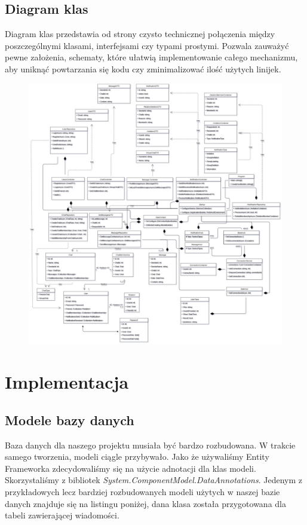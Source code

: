 \documentclass[12pt,a4paper]{article}
\begin{document}
\subsection{Diagram klas}
\hspace*{0.7cm} Diagram klas przedstawia od strony czysto technicznej połączenia między poszczególnymi klasami, interfejsami czy typami prostymi. Pozwala zauważyć pewne założenia, schematy, które ułatwią implementowanie całego mechanizmu, aby uniknąć powtarzania się kodu czy zminimalizować ilość użytych linijek. 

\begin{figure}[H]
	\centering
	\includegraphics[width=0.7\linewidth]{DiagramKlas}
	\caption{}
	\label{fig:diagramklas}
\end{figure}


\section{Implementacja}

\subsection{Modele bazy danych}				%

\hspace*{0.7cm} Baza danych dla naszego projektu musiała być bardzo rozbudowana. W trakcie samego tworzenia, modeli ciągle przybywało. Jako że używaliśmy Entity Frameworka zdecydowaliśmy się na użycie adnotacji dla klas modeli. Skorzystaliśmy z bibliotek \textit{System.ComponentModel.DataAnnotations}. Jedenym z przykładowych lecz bardziej rozbudowanych modeli użytych w naszej bazie danych znajduje się na listingu poniżej, dana klasa została przygotowana dla tabeli zawierającej wiadomości.\newline
\end{document}
